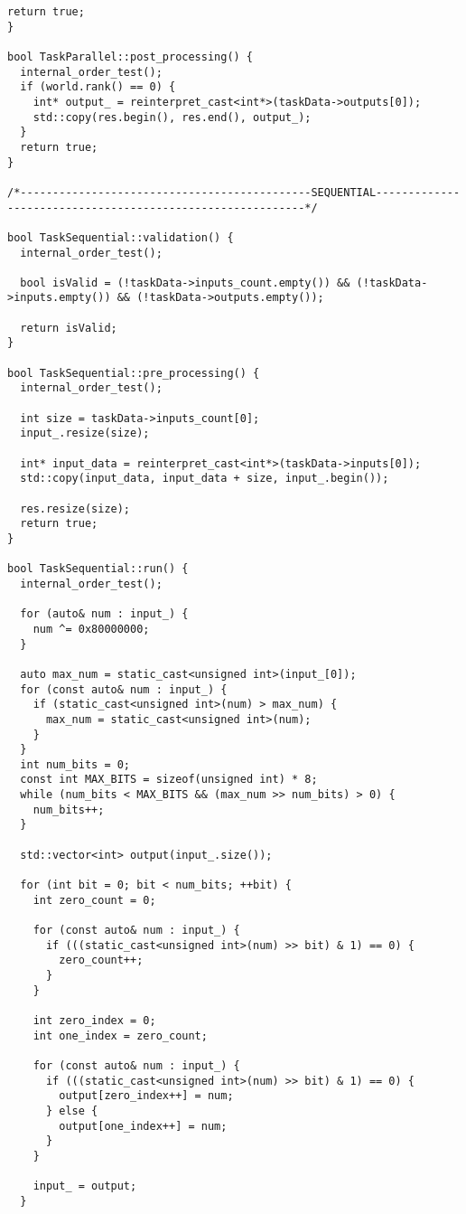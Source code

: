 \documentclass[12pt]{article}
\begin{document}
\begin{lstlisting}[caption={Параллельная версия поразрядной сортировки с использованием MPI}]
  return true;
}

bool TaskParallel::post_processing() {
  internal_order_test();
  if (world.rank() == 0) {
    int* output_ = reinterpret_cast<int*>(taskData->outputs[0]);
    std::copy(res.begin(), res.end(), output_);
  }
  return true;
}

/*---------------------------------------------SEQUENTIAL-----------------------------------------------------------*/

bool TaskSequential::validation() {
  internal_order_test();

  bool isValid = (!taskData->inputs_count.empty()) && (!taskData->inputs.empty()) && (!taskData->outputs.empty());

  return isValid;
}

bool TaskSequential::pre_processing() {
  internal_order_test();

  int size = taskData->inputs_count[0];
  input_.resize(size);

  int* input_data = reinterpret_cast<int*>(taskData->inputs[0]);
  std::copy(input_data, input_data + size, input_.begin());

  res.resize(size);
  return true;
}

bool TaskSequential::run() {
  internal_order_test();

  for (auto& num : input_) {
    num ^= 0x80000000;
  }

  auto max_num = static_cast<unsigned int>(input_[0]);
  for (const auto& num : input_) {
    if (static_cast<unsigned int>(num) > max_num) {
      max_num = static_cast<unsigned int>(num);
    }
  }
  int num_bits = 0;
  const int MAX_BITS = sizeof(unsigned int) * 8;
  while (num_bits < MAX_BITS && (max_num >> num_bits) > 0) {
    num_bits++;
  }

  std::vector<int> output(input_.size());

  for (int bit = 0; bit < num_bits; ++bit) {
    int zero_count = 0;

    for (const auto& num : input_) {
      if (((static_cast<unsigned int>(num) >> bit) & 1) == 0) {
        zero_count++;
      }
    }

    int zero_index = 0;
    int one_index = zero_count;

    for (const auto& num : input_) {
      if (((static_cast<unsigned int>(num) >> bit) & 1) == 0) {
        output[zero_index++] = num;
      } else {
        output[one_index++] = num;
      }
    }

    input_ = output;
  }


\end{lstlisting}
\end{document}
